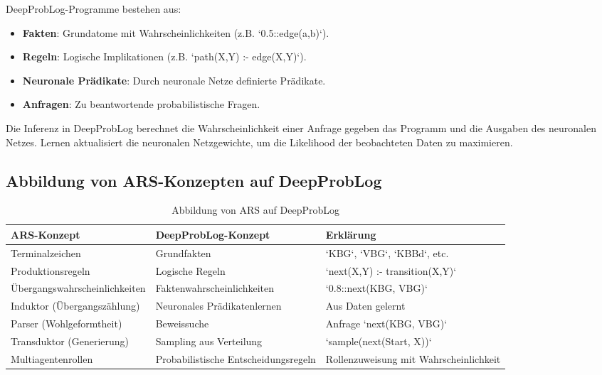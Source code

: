 \documentclass[12pt,a4paper]{article}
\begin{document}
DeepProbLog-Programme bestehen aus:

\begin{itemize}
    \item \textbf{Fakten}: Grundatome mit Wahrscheinlichkeiten (z.B. `0.5::edge(a,b)`).
    \item \textbf{Regeln}: Logische Implikationen (z.B. `path(X,Y) :- edge(X,Y)`).
    \item \textbf{Neuronale Prädikate}: Durch neuronale Netze definierte Prädikate.
    \item \textbf{Anfragen}: Zu beantwortende probabilistische Fragen.
\end{itemize}

Die Inferenz in DeepProbLog berechnet die Wahrscheinlichkeit einer Anfrage 
gegeben das Programm und die Ausgaben des neuronalen Netzes. Lernen aktualisiert 
die neuronalen Netzgewichte, um die Likelihood der beobachteten Daten zu 
maximieren.

\subsection{Abbildung von ARS-Konzepten auf DeepProbLog}

\begin{table}[H]
\centering
\caption{Abbildung von ARS auf DeepProbLog}
\label{tab:mapping}
\begin{tabular}{@{} p{4cm} p{4cm} p{4cm} @{}}
\toprule
\textbf{ARS-Konzept} & \textbf{DeepProbLog-Konzept} & \textbf{Erklärung} \\
\midrule
Terminalzeichen & Grundfakten & `KBG`, `VBG`, `KBBd`, etc. \\
Produktionsregeln & Logische Regeln & `next(X,Y) :- transition(X,Y)` \\
Übergangswahrscheinlichkeiten & Faktenwahrscheinlichkeiten & `0.8::next(KBG, VBG)` \\
Induktor (Übergangszählung) & Neuronales Prädikatenlernen & Aus Daten gelernt \\
Parser (Wohlgeformtheit) & Beweissuche & Anfrage `next(KBG, VBG)` \\
Transduktor (Generierung) & Sampling aus Verteilung & `sample(next(Start, X))` \\
Multiagentenrollen & Probabilistische Entscheidungsregeln & Rollenzuweisung mit Wahrscheinlichkeit \\
\bottomrule
\end{tabular}
\end{table}
\end{document}
